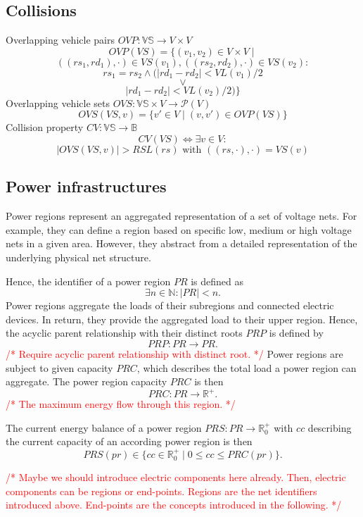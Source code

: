 \documentclass[conference]{IEEEtran}
\newcommand{\todo}[1]{\textcolor{red}{/* #1 */}}
\begin{document}
	\subsection{Collisions}
	\label{collisions}
	
	Overlapping vehicle pairs $OVP : \mathbb{VS} \rightarrow V \times V$
	\[
		OVP(VS) = \{(v_1, v_2) \in V \times V \mid
	\]
	\[
		((rs_1,rd_1),\cdot) \in VS(v_1), ((rs_2,rd_2),\cdot) \in VS(v_2) :
	\]
	\[
		rs_1 = rs_2 \wedge (|rd_1 - rd_2| < VL(v_1) / 2
	\]
	\[
		\vee
	\]
	\[
		|rd_1 - rd_2| < VL(v_2) / 2)\}
	\]
	Overlapping vehicle sets $OVS : \mathbb{VS} \times V \rightarrow \mathcal{P}(V)$
	\[
		OVS(VS,v) = \{v' \in V \mid (v, v') \in OVP(VS)\}
	\]
	Collision property $CV : \mathbb{VS} \rightarrow \mathbb{B}$
	\[
		CV(VS) \Leftrightarrow \exists v \in V :
	\]
	\[
		|OVS(VS, v)| > RSL(rs) \text{ with } ((rs,\cdot),\cdot) = VS(v)
	\]
	
	\subsection{Power infrastructures}
	\label{power}
	
	Power regions represent an aggregated representation of a set of voltage nets. For example, they can define a region based on specific low, medium or high voltage nets in a given area. However, they abstract from a detailed representation of the underlying physical net structure.  
	
	Hence, the identifier of a power region $PR$ is defined as
	\[
	\exists n \in \mathbb{N} : |PR| < n \mathrm{.}
	\]
	Power regions aggregate the loads of their subregions and connected electric devices. In return, they provide the aggregated load to their upper region.
	Hence, the acyclic parent relationship with their distinct roots $PRP$ is defined by 
	\[
	PRP : PR \to PR \mathrm{.}
	\]
	\todo{Require acyclic parent relationship with distinct root.}
	Power regions are subject to given capacity $PRC$, which describes the total load a power region can aggregate.
	The power region capacity $PRC$ is then
	\[
	PRC : PR \rightarrow \mathbb{R}^+ \mathrm{.}
	\]
	\todo{The maximum energy flow through this region.}
	 
	The current energy balance of a power region
	$PRS : PR \rightarrow \mathbb{R}_0^+$ with $cc$ describing the current capacity of an according power region is then
	\[
	PRS(pr) \in \{ cc \in \mathbb{R}_0^+ \mid 0 \leq cc \leq PRC(pr) \} \mathrm{.}
	\]
	
	\todo{Maybe we should introduce electric components here already. Then, electric components can be regions or end-points. Regions are the net identifiers introduced above. End-points are the concepts introduced in the following.}
	
\end{document}
